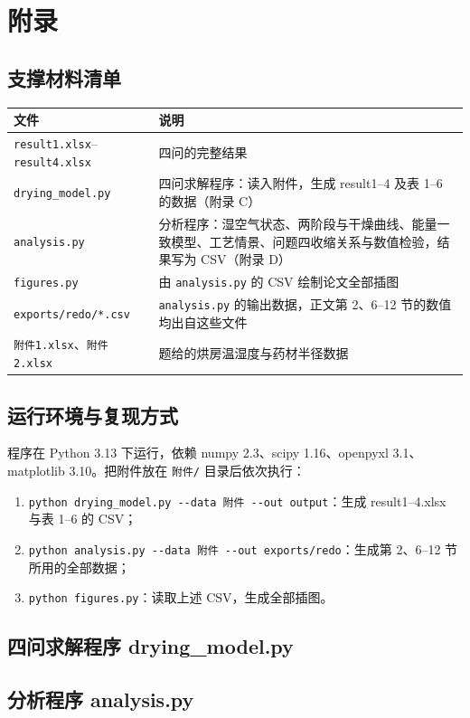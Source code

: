 \appendix
\section*{附录}
\setcounter{subsection}{0}
\renewcommand{\thesubsection}{附录 \Alph{subsection}}

\subsection{支撑材料清单}

\begin{center}\small
\renewcommand{\arraystretch}{1.2}
\begin{tabular}{C{4.2cm}C{10.4cm}}
\toprule
文件 & 说明 \\
\midrule
\texttt{result1.xlsx}--\texttt{result4.xlsx} & 四问的完整结果 \\
\texttt{drying\_model.py} & 四问求解程序：读入附件，生成 result1--4 及表 1--6 的数据（附录 C） \\
\texttt{analysis.py} & 分析程序：湿空气状态、两阶段与干燥曲线、能量一致模型、工艺情景、问题四收缩关系与数值检验，结果写为 CSV（附录 D） \\
\texttt{figures.py} & 由 \texttt{analysis.py} 的 CSV 绘制论文全部插图 \\
\texttt{exports/redo/*.csv} & \texttt{analysis.py} 的输出数据，正文第 2、6--12 节的数值均出自这些文件 \\
\texttt{附件1.xlsx}、\texttt{附件2.xlsx} & 题给的烘房温湿度与药材半径数据 \\
\bottomrule
\end{tabular}
\end{center}

\subsection{运行环境与复现方式}

程序在 Python 3.13 下运行，依赖 numpy 2.3、scipy 1.16、openpyxl 3.1、matplotlib 3.10。把附件放在 \texttt{附件/} 目录后依次执行：
\begin{enumerate}[label=(\arabic*),leftmargin=2.2em,itemsep=1pt]
\item \texttt{python drying\_model.py -{}-data 附件 -{}-out output}：生成 result1--4.xlsx 与表 1--6 的 CSV；
\item \texttt{python analysis.py -{}-data 附件 -{}-out exports/redo}：生成第 2、6--12 节所用的全部数据；
\item \texttt{python figures.py}：读取上述 CSV，生成全部插图。
\end{enumerate}

\subsection{四问求解程序 drying\_model.py}



\subsection{分析程序 analysis.py}


